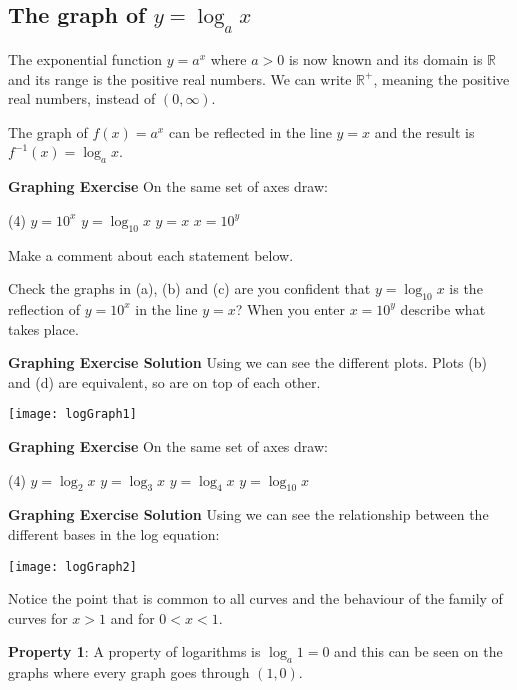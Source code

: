 \subsection*{The graph of $y =\log _{a} x$}
The exponential function $y =a^{x}$ where $a >0$ is now known and its domain is $\mathbb{R}$ and its range is the positive real numbers. We can write $\mathbb{R}^{ +}$, meaning the positive real numbers, instead of $(0 ,\infty)$. 

The graph of $f (x) =a^{x}$ can be reflected in the line $y =x$ and the result is $f^{ -1} (x) =\log _{a} x$. 

\textbf{Graphing Exercise} On the same set of axes draw:
\begin{tasks}(4)
	\task $y =10^{x}$ 
	\task $y =\log _{10} x$ 
	\task $y =x$ 
	\task $x =10^{y}$ 
\end{tasks}

Make a comment about each statement below. 
\begin{tasks}
	\task[1.] Check the graphs in (a), (b) and (c) are you confident that $y =\log _{10} x$ is the reflection of $y =10^{x}$ in the line $y =x$?
	\task[2.] When you enter $x =10^{y}$ describe what takes place.
	\end{tasks}

\textbf{Graphing Exercise Solution} Using \desmos we can see the different plots. Plots (b) and (d) are equivalent, so are on top of each other.\\
\begin{center}
\texttt{[image: logGraph1]}\\
\end{center}

\textbf{Graphing Exercise} On the same set of axes draw:
\begin{tasks}(4)
	\task $y =\log _{2} x$ 
	\task $y =\log _{3} x$ 
	\task $y =\log _{4} x$ 
	\task $y =\log _{10} x$ \end{tasks}
\textbf{Graphing Exercise Solution} Using \desmos we can see the relationship between the different bases in the log equation:\\
\begin{center}\texttt{[image: logGraph2]}\end{center}
Notice the point that is common to all curves and the behaviour of the family of curves for $x >1$ and for $0 <x <1$. 

\textbf{Property 1}: A property of logarithms is $\log _{a} 1 =0$ and this can be seen on the graphs where every graph goes through $\left (1 ,0\right )$. 


